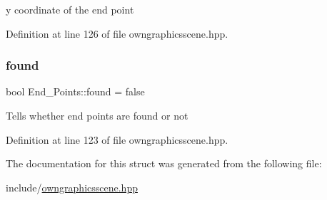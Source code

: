 y coordinate of the end point 

Definition at line 126 of file owngraphicsscene.\+hpp.

\mbox{\label{structEnd__Points_aff9dd173210b07bb087d70cf5ec9439f}} 
\subsubsection{\texorpdfstring{found}{found}}
{\footnotesize\ttfamily bool End\+\_\+\+Points\+::found = false}

Tells whether end points are found or not 

Definition at line 123 of file owngraphicsscene.\+hpp.



The documentation for this struct was generated from the following file\+:\begin{DoxyCompactItemize}
\item 
include/\mbox{\hyperlink{owngraphicsscene_8hpp}{owngraphicsscene.\+hpp}}\end{DoxyCompactItemize}
